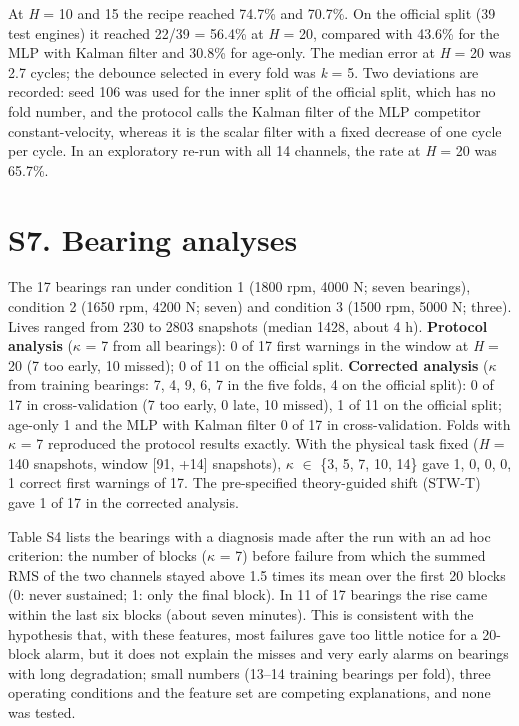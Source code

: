 \documentclass[11pt,a4paper]{article}
\begin{document}
\noindent At \textit{H} = 10 and 15 the recipe reached 74.7\% and 70.7\%. On the official split (39 test engines) it reached 22/39 = 56.4\% at \textit{H} = 20, compared with 43.6\% for the MLP with Kalman filter and 30.8\% for age-only. The median error at \textit{H} = 20 was \textminus{}2.7 cycles; the debounce selected in every fold was \textit{k} = 5. Two deviations are recorded: seed 106 was used for the inner split of the official split, which has no fold number, and the protocol calls the Kalman filter of the MLP competitor constant-velocity, whereas it is the scalar filter with a fixed decrease of one cycle per cycle. In an exploratory re-run with all 14 channels, the rate at \textit{H} = 20 was 65.7\%.

\section*{S7. Bearing analyses}

\noindent The 17 bearings ran under condition 1 (1800 rpm, 4000 N; seven bearings), condition 2 (1650 rpm, 4200 N; seven) and condition 3 (1500 rpm, 5000 N; three). Lives ranged from 230 to 2803 snapshots (median 1428, about 4 h). \textbf{Protocol analysis} ($\kappa$ = 7 from all bearings): 0 of 17 first warnings in the window at \textit{H} = 20 (7 too early, 10 missed); 0 of 11 on the official split. \textbf{Corrected analysis} ($\kappa$ from training bearings: 7, 4, 9, 6, 7 in the five folds, 4 on the official split): 0 of 17 in cross-validation (7 too early, 0 late, 10 missed), 1 of 11 on the official split; age-only 1 and the MLP with Kalman filter 0 of 17 in cross-validation. Folds with $\kappa$ = 7 reproduced the protocol results exactly. With the physical task fixed (\textit{H} = 140 snapshots, window [\textminus{}91, +14] snapshots), $\kappa$ $\in$ \{3, 5, 7, 10, 14\} gave 1, 0, 0, 0, 1 correct first warnings of 17. The pre-specified theory-guided shift (STW-T) gave 1 of 17 in the corrected analysis.

\noindent Table S4 lists the bearings with a diagnosis made after the run with an ad hoc criterion: the number of blocks ($\kappa$ = 7) before failure from which the summed RMS of the two channels stayed above 1.5 times its mean over the first 20 blocks (0: never sustained; 1: only the final block). In 11 of 17 bearings the rise came within the last six blocks (about seven minutes). This is consistent with the hypothesis that, with these features, most failures gave too little notice for a 20-block alarm, but it does not explain the misses and very early alarms on bearings with long degradation; small numbers (13--14 training bearings per fold), three operating conditions and the feature set are competing explanations, and none was tested.
\end{document}
